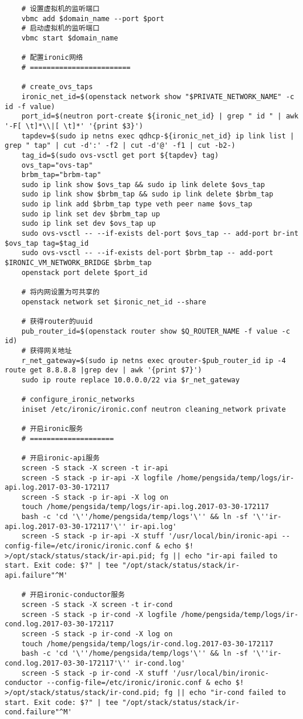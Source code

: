 \documentclass[a4paper,left=1.5cm,right=1.5cm,11pt]{article}
\begin{document}
\begin{lstlisting}
	# 设置虚拟机的监听端口
	vbmc add $domain_name --port $port
	# 启动虚拟机的监听端口
	vbmc start $domain_name

	# 配置ironic网络
	# ========================

	# create_ovs_taps
	ironic_net_id=$(openstack network show "$PRIVATE_NETWORK_NAME" -c id -f value)
	port_id=$(neutron port-create ${ironic_net_id} | grep " id " | awk '-F[ \t]*\\|[ \t]*' '{print $3}')
	tapdev=$(sudo ip netns exec qdhcp-${ironic_net_id} ip link list | grep " tap" | cut -d':' -f2 | cut -d'@' -f1 | cut -b2-)
	tag_id=$(sudo ovs-vsctl get port ${tapdev} tag)
	ovs_tap="ovs-tap"
    brbm_tap="brbm-tap"
    sudo ip link show $ovs_tap && sudo ip link delete $ovs_tap
    sudo ip link show $brbm_tap && sudo ip link delete $brbm_tap
    sudo ip link add $brbm_tap type veth peer name $ovs_tap
    sudo ip link set dev $brbm_tap up
    sudo ip link set dev $ovs_tap up
    sudo ovs-vsctl -- --if-exists del-port $ovs_tap -- add-port br-int $ovs_tap tag=$tag_id
    sudo ovs-vsctl -- --if-exists del-port $brbm_tap -- add-port $IRONIC_VM_NETWORK_BRIDGE $brbm_tap
	openstack port delete $port_id

	# 将内网设置为可共享的
	openstack network set $ironic_net_id --share

	# 获得router的uuid
	pub_router_id=$(openstack router show $Q_ROUTER_NAME -f value -c id)
	# 获得网关地址
	r_net_gateway=$(sudo ip netns exec qrouter-$pub_router_id ip -4 route get 8.8.8.8 |grep dev | awk '{print $7}')
	sudo ip route replace 10.0.0.0/22 via $r_net_gateway

	# configure_ironic_networks
	iniset /etc/ironic/ironic.conf neutron cleaning_network private

	# 开启ironic服务
	# ====================

	# 开启ironic-api服务
	screen -S stack -X screen -t ir-api
	screen -S stack -p ir-api -X logfile /home/pengsida/temp/logs/ir-api.log.2017-03-30-172117
    screen -S stack -p ir-api -X log on
	touch /home/pengsida/temp/logs/ir-api.log.2017-03-30-172117
    bash -c 'cd '\''/home/pengsida/temp/logs'\'' && ln -sf '\''ir-api.log.2017-03-30-172117'\'' ir-api.log'
	screen -S stack -p ir-api -X stuff '/usr/local/bin/ironic-api --config-file=/etc/ironic/ironic.conf & echo $! >/opt/stack/status/stack/ir-api.pid; fg || echo "ir-api failed to start. Exit code: $?" | tee "/opt/stack/status/stack/ir-api.failure"^M'

	# 开启ironic-conductor服务
	screen -S stack -X screen -t ir-cond
	screen -S stack -p ir-cond -X logfile /home/pengsida/temp/logs/ir-cond.log.2017-03-30-172117
    screen -S stack -p ir-cond -X log on
	touch /home/pengsida/temp/logs/ir-cond.log.2017-03-30-172117
    bash -c 'cd '\''/home/pengsida/temp/logs'\'' && ln -sf '\''ir-cond.log.2017-03-30-172117'\'' ir-cond.log'
	screen -S stack -p ir-cond -X stuff '/usr/local/bin/ironic-conductor --config-file=/etc/ironic/ironic.conf & echo $! >/opt/stack/status/stack/ir-cond.pid; fg || echo "ir-cond failed to start. Exit code: $?" | tee "/opt/stack/status/stack/ir-cond.failure"^M'


\end{lstlisting}
\end{document}
